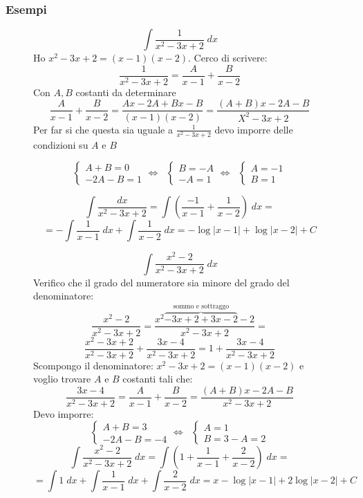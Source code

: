 \documentclass[a4paper]{article}
\theoremstyle{break}
\theoremstyle{break}
\theoremstyle{break}
\theoremstyle{break}
\begin{document}
\subsubsection{Esempi}
\begin{figure}[H]
  \begin{example}
    \[
      \int \frac{1}{x^2-3x+2}\;dx
    \] 
    Ho \( x^2 -3x + 2 = (x-1)(x-2)\). Cerco di scrivere:
    \[
      \frac{1}{x^2-3x+2} = \frac{A}{x-1} + \frac{B}{x-2}
    \] 
    Con \( A,B \) costanti da determinare 
    \[
      \frac{A}{x-1} + \frac{B}{x-2} = \frac{Ax - 2A + Bx - B}{(x-1)(x-2)} = \frac{(A+B)x -2A-B}{X^2-3x+2}
    \] 
    Per far si che questa sia uguale a \( \frac{1}{x^2-3x+2} \) devo imporre delle condizioni su \( A \) e \( B \) 

    \[
      \begin{cases}
        A+B = 0 \\
        -2A-B = 1
      \end{cases}
      \Leftrightarrow\;\;
      \begin{cases}
        B = -A\\
        -A = 1
      \end{cases}
      \Leftrightarrow\;\;
      \begin{cases}
        A = -1\\
        B = 1
      \end{cases}
    \] 

    \[
      \int \frac{dx}{x^2-3x+2} = \int \left(\frac{-1}{x-1} + \frac{1}{x-2}\right)\;dx = 
    \] 
    \[
      = -\int \frac{1}{x-1}\;dx + \int \frac{1}{x-2}\;dx = -\log|x-1| + \log|x-2| + C
    \] 
  \end{example}
\end{figure}

\begin{figure}[H]
  \begin{example}
    \[
      \int \frac{x^2-2}{x^2-3x+2}\;dx
    \] 
    Verifico che il grado del numeratore sia minore del grado del denominatore:
    \[
      \frac{x^2-2}{x^2-3x+2} = \frac{x^2 \overbrace{-3x+2 + 3x-2}^{\text{sommo e sottraggo}}  -2}{x^2-3x+2} =
    \] 
    \[
      \frac{x^2-3x+2}{x^2-3x+2} + \frac{3x-4}{x^2-3x+2} = 1 + \frac{3x-4}{x^2-3x+2}
    \] 
    Scompongo il denominatore: \( x^2-3x+2 = (x-1)(x-2) \) e voglio trovare \( A \) e \( B \) 
    costanti tali che:
    \[
      \frac{3x-4}{x^2-3x+2} = \frac{A}{x-1} + \frac{B}{x-2} = \frac{(A+B)x -2A-B}{x^2-3x+2}
    \] 
    Devo imporre:
    \[
      \begin{cases}
        A+B = 3 \\
        -2A-B = -4
      \end{cases}
      \Leftrightarrow\;\;
      \begin{cases}
        A = 1 \\
        B = 3 - A = 2
      \end{cases}
    \] 
    \[
      \int \frac{x^2-2}{x^2-3x+2}\;dx = \int \left( 1 + \frac{1}{x-1} + \frac{2}{x-2} \right)\; dx=
    \] 
    \[
      = \int 1\;dx + \int \frac{1}{x-1}\;dx + \int \frac{2}{x-2}\;dx = x - \log|x-1| + 2 \log|x-2| + C
    \] 
  \end{example}
\end{figure}
\end{document}
